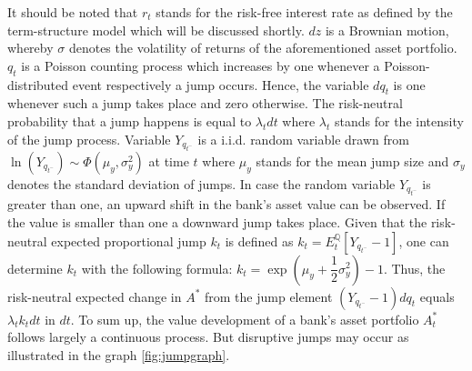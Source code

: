 It should be noted that $r_t$ stands for the risk-free interest rate as defined by the \citet{cox1985theory} term-structure model which will be discussed shortly. $dz$ is a Brownian motion, whereby $\sigma$ denotes the volatility of returns of the aforementioned asset portfolio. $q_t$ is a Poisson counting process which increases by one whenever a Poisson-distributed event respectively a jump occurs. Hence, the variable $dq_t$ is one whenever such a jump takes place and zero otherwise. The risk-neutral probability that a jump happens is equal to $\lambda_t dt$ where $\lambda_t$ stands for the intensity of the jump process. Variable $Y_{q_{t^{-}}}$ is a i.i.d. random variable drawn from $\ln(Y_{q_{t^{-}}}) \sim \Phi\left(\mu_{y}, \sigma^2_{y}\right)$ at time $t$ where $\mu_{y}$ stands for the mean jump size and $\sigma_{y}$ denotes the standard deviation of jumps. In case the random variable $Y_{q_{t^{-}}}$ is greater than one, an upward shift in the bank's asset value can be observed. If the value is smaller than one a downward jump takes place. Given that the risk-neutral expected proportional jump $k_t$ is defined as $k_t = E^\mathbb{Q}_t\left[ Y_{q_{t^{-}}} - 1 \right]$, one can determine $k_t$ with the following formula: $k_t = \exp(\mu_{y}+\dfrac{1}{2}\sigma_y^2) - 1$. Thus, the risk-neutral expected change in $A^*$ from the jump element $(Y_{q_{t^{-}}}-1)dq_t$ equals $\lambda_t k_t dt$ in $dt$. To sum up, the value development of a bank's asset portfolio $A_t^*$ follows largely a continuous process. But disruptive jumps may occur as illustrated in the graph \ref{fig:jumpgraph}.\\
